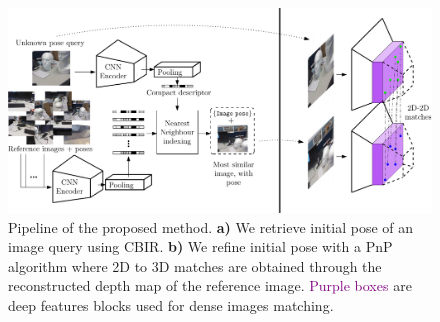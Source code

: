 \begin{figure}
	\centering
	\includegraphics[width=\linewidth]{method/common_pipeline}	
	\caption[Pipeline of our pose refinement method]{\label{fig:pipeline} Pipeline of the proposed method. \textbf{a)} We retrieve initial pose of an image query using CBIR. \textbf{b)} We refine initial pose with a PnP algorithm where 2D to 3D matches are obtained through the reconstructed depth map of the reference image. \textcolor{purple}{Purple boxes} are deep features blocks used for dense images matching.}
\end{figure}
